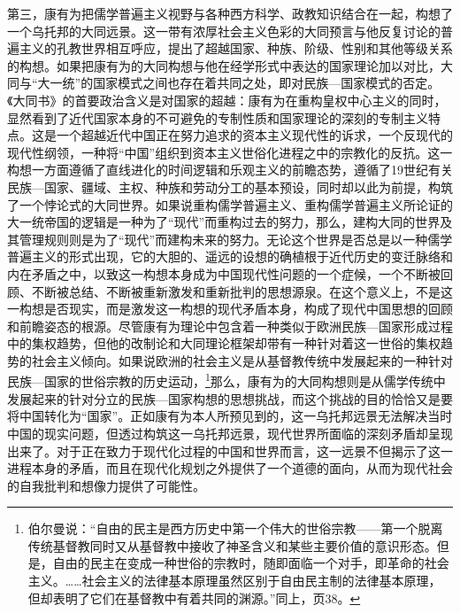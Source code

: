 \documentclass[a4paper, 12pt, openright]{ctexbook}
\begin{document}
第三，康有为把儒学普遍主义视野与各种西方科学、政教知识结合在一起，构想了一个乌托邦的大同远景。这一带有浓厚社会主义色彩的大同预言与他反复讨论的普遍主义的孔教世界相互呼应，提出了超越国家、种族、阶级、性别和其他等级关系的构想。如果把康有为的大同构想与他在经学形式中表达的国家理论加以对比，大同与“大一统”的国家模式之间也存在着共同之处，即对民族—国家模式的否定。《大同书》的首要政治含义是对国家的超越：康有为在重构皇权中心主义的同时，显然看到了近代国家本身的不可避免的专制性质和国家理论的深刻的专制主义特点。这是一个超越近代中国正在努力追求的资本主义现代性的诉求，一个反现代的现代性纲领，一种将“中国”组织到资本主义世俗化进程之中的宗教化的反抗。这一构想一方面遵循了直线进化的时间逻辑和乐观主义的前瞻态势，遵循了19世纪有关民族—国家、疆域、主权、种族和劳动分工的基本预设，同时却以此为前提，构筑了一个悖论式的大同世界。如果说重构儒学普遍主义、重构儒学普遍主义所论证的大一统帝国的逻辑是一种为了“现代”而重构过去的努力，那么，建构大同的世界及其管理规则则是为了“现代”而建构未来的努力。无论这个世界是否总是以一种儒学普遍主义的形式出现，它的大胆的、遥远的设想的确植根于近代历史的变迁脉络和内在矛盾之中，以致这一构想本身成为中国现代性问题的一个症候，一个不断被回顾、不断被总结、不断被重新激发和重新批判的思想源泉。在这个意义上，不是这一构想是否现实，而是激发这一构想的现代矛盾本身，构成了现代中国思想的回顾和前瞻姿态的根源。尽管康有为理论中包含着一种类似于欧洲民族—国家形成过程中的集权趋势，但他的改制论和大同理论框架却带有一种针对着这一世俗的集权趋势的社会主义倾向。如果说欧洲的社会主义是从基督教传统中发展起来的一种针对民族—国家的世俗宗教的历史运动，\footnote{伯尔曼说：“自由的民主是西方历史中第一个伟大的世俗宗教——第一个脱离传统基督教同时又从基督教中接收了神圣含义和某些主要价值的意识形态。但是，自由的民主在变成一种世俗的宗教时，随即面临一个对手，即革命的社会主义。……社会主义的法律基本原理虽然区别于自由民主制的法律基本原理，但却表明了它们在基督教中有着共同的渊源。”同上，页38。}那么，康有为的大同构想则是从儒学传统中发展起来的针对分立的民族—国家构想的思想挑战，而这个挑战的目的恰恰又是要将中国转化为“国家”。正如康有为本人所预见到的，这一乌托邦远景无法解决当时中国的现实问题，但透过构筑这一乌托邦远景，现代世界所面临的深刻矛盾却呈现出来了。对于正在致力于现代化过程的中国和世界而言，这一远景不但揭示了这一进程本身的矛盾，而且在现代化规划之外提供了一个道德的面向，从而为现代社会的自我批判和想像力提供了可能性。
\end{document}
